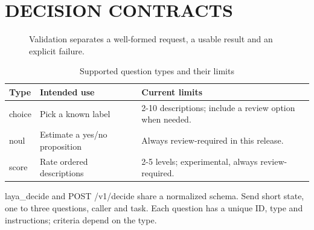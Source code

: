\documentclass[10pt,a4paper]{article}
\begin{document}
\section{DECISION CONTRACTS}
\begin{figure}[H]
\centering
{}
\caption{Validation separates a well-formed request, a usable result and an explicit failure.}
\end{figure}
\begin{table}[H]
\centering\small
\renewcommand{\arraystretch}{1.15}
\begin{tabularx}{\linewidth}{@{}YYY@{}}
\toprule
\textbf{Type} & \textbf{Intended use} & \textbf{Current limits} \\
\midrule
choice & Pick a known label & 2-10 descriptions; include a review option when needed. \\
noul & Estimate a yes/no proposition & Always review-required in this release. \\
score & Rate ordered descriptions & 2-5 levels; experimental, always review-required. \\
\bottomrule
\end{tabularx}
\caption{Supported question types and their limits}
\end{table}
laya\_decide and POST /v1/decide share a normalized schema. Send short state, one to three questions, caller and task. Each question has a unique ID, type and instructions; criteria depend on the type.
\end{document}
